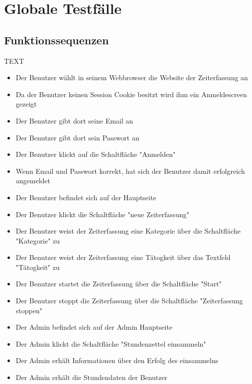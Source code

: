\section{Globale Testfälle}

\subsection{Funktionssequenzen}
\begin{requirements}
\item TEXT
	\begin{itemize}
  			\item Der Benutzer wählt in seinem Webbrowser die Website der Zeiterfassung an
  			\item Da der Benutzer keinen Session Cookie besitzt wird ihm ein Anmeldescreen gezeigt
  			\item Der Benutzer gibt dort seine Email an
  			\item Der Benutzer gibt dort sein Passwort an
  			\item Der Benutzer klickt auf die Schaltfläche "Anmelden"
  			\item Wenn Email und Passwort korrekt, hat sich der Benutzer damit erfolgreich angemeldet
	\end{itemize}

	\begin{itemize}
		\item Der Benutzer befindet sich auf der Hauptseite
		\item Der Benutzer klickt die Schaltfläche "neue Zeiterfassung"
		\item Der Benutzer weist der Zeiterfassung eine Kategorie über die Schaltfläche "Kategorie" zu
		\item Der Benutzer weist der Zeiterfassung eine Tätogkeit über das Textfeld "Tätogkeit" zu
		\item Der Benutzer startet die Zeiterfassung über die Schaltfläche "Start"
		\item Der Benutzer stoppt die Zeiterfassung über die Schaltfläche "Zeiterfassung stoppen"
	\end {itemize}

	\begin{itemize}
		\item Der Admin befindet sich auf der Admin Hauptseite
		\item Der Admin klickt die Schaltfläche "Stundenzettel einsammeln"
		\item Der Admin erhält Informationen über den Erfolg des einsammelns
		\item Der Admin erhält die Stundendaten der Benutzer
	\end {itemize}


\end{requirements}
